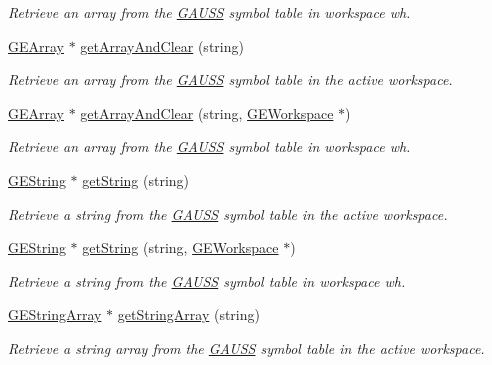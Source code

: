 \begin{DoxyCompactItemize}
\begin{DoxyCompactList}\small\item\em Retrieve an array from the \hyperlink{class_g_a_u_s_s}{G\-A\-U\-S\-S} symbol table in workspace {\itshape wh}. \end{DoxyCompactList}\item 
\hyperlink{class_g_e_array}{G\-E\-Array} $\ast$ \hyperlink{class_g_a_u_s_s_ad2bcca793c43675ff937c8637ec3e3e3}{get\-Array\-And\-Clear} (string)
\begin{DoxyCompactList}\small\item\em Retrieve an array from the \hyperlink{class_g_a_u_s_s}{G\-A\-U\-S\-S} symbol table in the active workspace. \end{DoxyCompactList}\item 
\hyperlink{class_g_e_array}{G\-E\-Array} $\ast$ \hyperlink{class_g_a_u_s_s_a9773d66de682d40025edef5b372ab9b8}{get\-Array\-And\-Clear} (string, \hyperlink{class_g_e_workspace}{G\-E\-Workspace} $\ast$)
\begin{DoxyCompactList}\small\item\em Retrieve an array from the \hyperlink{class_g_a_u_s_s}{G\-A\-U\-S\-S} symbol table in workspace {\itshape wh}. \end{DoxyCompactList}\item 
\hyperlink{class_g_e_string}{G\-E\-String} $\ast$ \hyperlink{class_g_a_u_s_s_ad75afe2cd19e141c15c97ad52373791d}{get\-String} (string)
\begin{DoxyCompactList}\small\item\em Retrieve a string from the \hyperlink{class_g_a_u_s_s}{G\-A\-U\-S\-S} symbol table in the active workspace. \end{DoxyCompactList}\item 
\hyperlink{class_g_e_string}{G\-E\-String} $\ast$ \hyperlink{class_g_a_u_s_s_a9b5d5caf2cc8932364a4a867c72b0854}{get\-String} (string, \hyperlink{class_g_e_workspace}{G\-E\-Workspace} $\ast$)
\begin{DoxyCompactList}\small\item\em Retrieve a string from the \hyperlink{class_g_a_u_s_s}{G\-A\-U\-S\-S} symbol table in workspace {\itshape wh}. \end{DoxyCompactList}\item 
\hyperlink{class_g_e_string_array}{G\-E\-String\-Array} $\ast$ \hyperlink{class_g_a_u_s_s_a9c1652bb6b3a931c75d9c7dd2ffe23cb}{get\-String\-Array} (string)
\begin{DoxyCompactList}\small\item\em Retrieve a string array from the \hyperlink{class_g_a_u_s_s}{G\-A\-U\-S\-S} symbol table in the active workspace. \end{DoxyCompactList}\item 

\end{DoxyCompactItemize}
